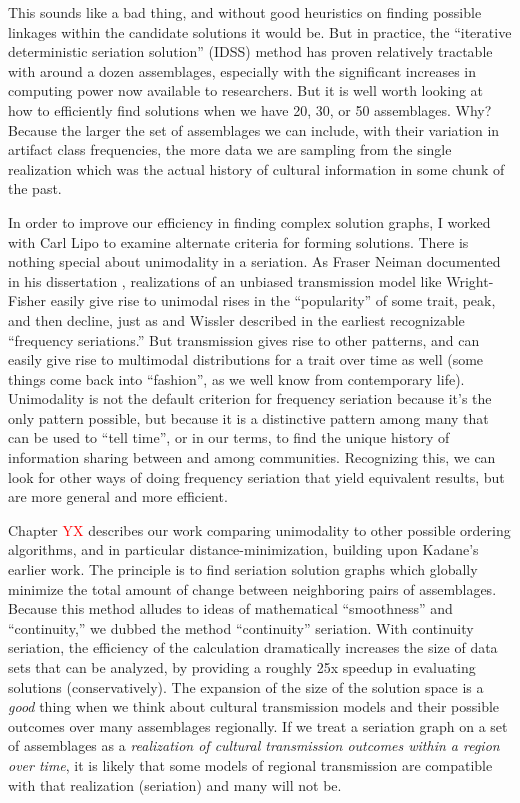 This sounds like a bad thing, and without good heuristics on finding possible linkages within the candidate solutions it would be.  But in practice, the ``iterative deterministic seriation solution'' (IDSS) method has proven relatively tractable with around a dozen assemblages, especially with the significant increases in computing power now available to researchers.  But it is well worth looking at how to efficiently find solutions when we have 20, 30, or 50 assemblages.  Why?  Because the larger the set of assemblages we can include, with their variation in artifact class frequencies, the more data we are sampling from the single realization which was the actual history of cultural information in some chunk of the past.  

In order to improve our efficiency in finding complex solution graphs, I worked with Carl Lipo to examine alternate criteria for forming solutions.  There is nothing special about unimodality in a seriation.  As Fraser Neiman documented in his dissertation \citeyearpar{Neiman1990}, realizations of an unbiased transmission model like Wright-Fisher easily give rise to unimodal rises in the ``popularity'' of some trait, peak, and then decline, just as \citet{Nelson1916} and Wissler \citet{wissler1916application} described in the earliest recognizable ``frequency seriations.''  But transmission gives rise to other patterns, and can easily give rise to multimodal distributions for a trait over time as well (some things come back into ``fashion'', as we well know from contemporary life).  Unimodality is not the default criterion for frequency seriation because it's the only pattern possible, but because it is a distinctive pattern among many that can be used to ``tell time'', or in our terms, to find the unique history of information sharing between and among communities.  Recognizing this, we can look for other ways of doing frequency seriation that yield equivalent results, but are more general and more efficient.  

Chapter \textcolor{red}{YX} describes our work comparing unimodality to other possible ordering algorithms, and in particular distance-minimization, building upon Kadane's \citeyearpar{Kadane1971} earlier work.  The principle is to find seriation solution graphs which globally minimize the total amount of change between neighboring pairs of assemblages.  Because this method alludes to ideas of mathematical ``smoothness'' and ``continuity,'' we dubbed the method ``continuity'' seriation.  With continuity seriation, the efficiency of the calculation dramatically increases the size of data sets that can be analyzed, by providing a roughly 25x speedup in evaluating solutions (conservatively).   The expansion of the size of the solution space is a \emph{good} thing when we think about cultural transmission models and their possible outcomes over many assemblages regionally.  If we treat a seriation graph on a set of assemblages as a \emph{realization of cultural transmission outcomes within a region over time}, it is likely that some models of regional transmission are compatible with that realization (seriation) and many will not be. 

